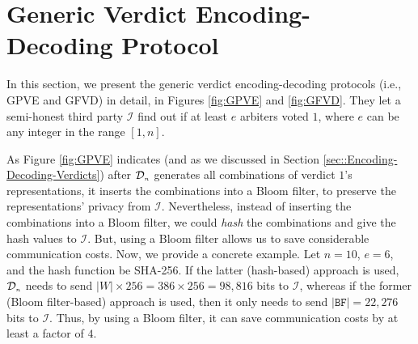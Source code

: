 
\section{Generic Verdict Encoding-Decoding Protocol}\label{sec::Generic-Verdict-Encoding-Decoding-Protocols}

In this section, we present the  generic verdict encoding-decoding protocols (i.e., GPVE and GFVD) in detail, in Figures \ref{fig:GPVE} and \ref{fig:GFVD}. They  let a semi-honest third party $\mathcal{I}$ find out if at least $e$ arbiters voted $1$, where $e$ can be any integer in the range $[1, n]$.  


As    Figure \ref{fig:GPVE} indicates (and as we discussed in Section \ref{sec::Encoding-Decoding-Verdicts}) after $\mathcal{D}_{\scriptscriptstyle n}$ generates all combinations of verdict $1$'s  representations, it inserts the combinations into a Bloom filter, to preserve the representations' privacy from $\mathcal{I}$. Nevertheless, instead of inserting the combinations into a Bloom filter, we could  \emph{hash}  the combinations and give the hash values to $\mathcal{I}$. But, using a Bloom filter allows us to save considerable communication costs. Now, we provide a concrete example. Let $n=10$, $e=6$, and the hash function be SHA-256.  If the latter (hash-based) approach is used,  $\mathcal{D}_{\scriptscriptstyle n}$ needs to send  $|W|\times 256= 386\times 256=98,816$ bits to $\mathcal{I}$, whereas  if the former (Bloom filter-based) approach is used, then it only needs to send $|\mathtt{BF}|=22,276 $ bits to $\mathcal{I}$. Thus, by using a Bloom filter,  it  can save  communication costs by at least a factor of  $4$.  


